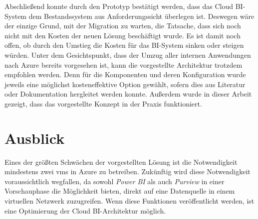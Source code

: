 Abschließend konnte durch den Prototyp bestätigt werden, dass das Cloud BI-System dem Bestandssystem aus Anforderungssicht überlegen ist. Deswegen wäre der einzige Grund, mit der Migration zu warten, die Tatsache, dass sich noch nicht mit den Kosten der neuen Lösung beschäftigt wurde. Es ist damit noch offen, ob durch den Umstieg die Kosten für das BI-System sinken oder steigen würden. Unter dem Gesichtspunkt, dass der Umzug aller internen Anwendungen nach Azure bereits vorgesehen ist, kann die vorgestellte Architektur trotzdem empfohlen werden. Denn für die Komponenten und deren Konfiguration wurde jeweils eine möglichst kosteneffektive Option gewählt, sofern dies aus Literatur oder Dokumentation hergleitet werden konnte. Außerdem wurde in dieser Arbeit gezeigt, dass das vorgestellte Konzept in der Praxis funktioniert. 

\section{Ausblick}
Eines der größten Schwächen der vorgestellten Lösung ist die Notwendigkeit mindestens zwei \acp{vm} in Azure zu betreiben. Zukünftig wird diese Notwendigkeit voraussichtlich wegfallen, da sowohl \textit{Power BI} als auch \textit{Purview} in einer Vorschauphase die Möglichkeit bieten, direkt auf eine Datenquelle in einem virtuellen Netzwerk zuzugreifen. Wenn diese Funktionen veröffentlicht werden, ist eine Optimierung der Cloud BI-Architektur möglich.